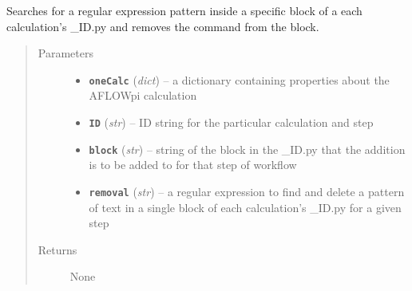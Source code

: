 \documentclass[letterpaper,10pt,english]{sphinxmanual}
\begin{document}
\begin{fulllineitems}
\label{prep:prep.__removeFromBlock}
Searches for a regular expression pattern inside a specific block of a each calculation's \_ID.py and
removes the command from the block.
\begin{quote}\begin{description}
\item[{Parameters}] \leavevmode\begin{itemize}
\item {} 
\textbf{\texttt{oneCalc}} (\emph{dict}) -- a dictionary containing properties about the AFLOWpi calculation

\item {} 
\textbf{\texttt{ID}} (\emph{str}) -- ID string for the particular calculation and step

\item {} 
\textbf{\texttt{block}} (\emph{str}) -- string of the block in the \_ID.py that the addition is to be added to
for that step of workflow

\item {} 
\textbf{\texttt{removal}} (\emph{str}) -- a regular expression to find and delete a pattern of text in a single block
of each calculation's \_ID.py for a given step

\end{itemize}

\item[{Returns}] \leavevmode
None

\end{description}\end{quote}

\end{fulllineitems}

\end{document}
